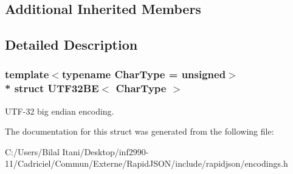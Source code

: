 \subsection*{Additional Inherited Members}


\subsection{Detailed Description}
\subsubsection*{template$<$typename Char\+Type = unsigned$>$\\*
struct U\+T\+F32\+B\+E$<$ Char\+Type $>$}

U\+T\+F-\/32 big endian encoding. 

The documentation for this struct was generated from the following file\+:\begin{DoxyCompactItemize}
\item 
C\+:/\+Users/\+Bilal Itani/\+Desktop/inf2990-\/11/\+Cadriciel/\+Commun/\+Externe/\+Rapid\+J\+S\+O\+N/include/rapidjson/encodings.\+h\end{DoxyCompactItemize}
